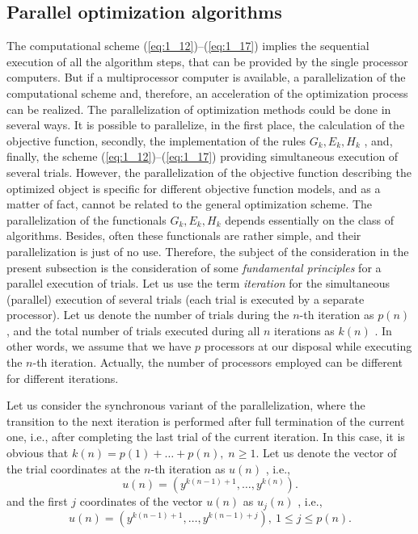 \subsection {Parallel optimization algorithms}
\label {subsec:1.2.2}
The computational scheme (\ref{eq:1_12})--(\ref{eq:1_17}) implies  the sequential execution of all the algorithm steps, that can be provided by the single processor computers. But if a multiprocessor computer is available, a parallelization of the computational scheme and, therefore, an acceleration of the optimization process can be realized. The parallelization of optimization methods could be done in several ways. It is possible to parallelize, in the first place, the calculation of the objective function, secondly, the implementation of the rules $G_k,E_k,H_k$ , and, finally, the scheme (\ref{eq:1_12})--(\ref{eq:1_17}) providing simultaneous execution of several trials. However, the parallelization of the objective function describing the optimized object is specific for different objective function models, and as a matter of fact, cannot be related to the general optimization scheme. The parallelization of the functionals  $G_k,E_k,H_k$ depends essentially on the class of algorithms. Besides, often these functionals are rather simple, and their parallelization is just of no use. Therefore, the subject of the consideration in the present subsection  is the consideration of some \textit {fundamental principles} for a parallel execution of trials.  Let us use the term \textit {iteration} for the simultaneous (parallel) execution of several trials (each trial is executed by a separate processor). Let us denote the number of trials during the $n$-th iteration as $p(n)$ , and the total number of trials executed during all $n$ iterations as $k(n)$ . In other words, we assume that we have  $p$  processors at our disposal while executing the $n$-th iteration. Actually, the number of processors employed can be different for different iterations. 

Let us consider the synchronous variant of the parallelization, where the transition to the next iteration is performed after full termination of the current one, i.e., after completing the last trial of the current iteration. In this case, it is obvious that $k(n)=p(1)+\ldots + p(n), \; n\geq 1$.  Let us denote the vector of the trial coordinates at the $n$-th iteration as $u(n)$ , i.e.,
\begin{displaymath}
u(n)=(y^{k(n-1)+1},\ldots ,y^{k(n)}) .
\end{displaymath}
and the first $j$ coordinates of the vector $u(n)$  as $u_j(n)$ , i.e., 
\begin{displaymath}
u(n)=(y^{k(n-1)+1},\ldots ,y^{k(n-1)+j}),\ 1\leq j\leq p(n) .
\end{displaymath}

